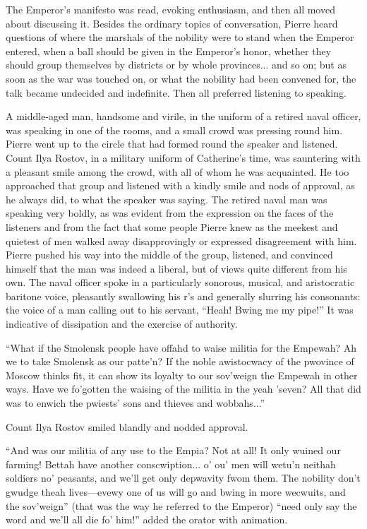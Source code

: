The Emperor's manifesto was read, evoking enthusiasm, and then
all moved about discussing it. Besides the ordinary topics of
conversation, Pierre heard questions of where the marshals of the
nobility were to stand when the Emperor entered, when a ball
should be given in the Emperor's honor, whether they should group
themselves by districts or by whole provinces... and so on; but
as soon as the war was touched on, or what the nobility had been
convened for, the talk became undecided and indefinite. Then all
preferred listening to speaking.

A middle-aged man, handsome and virile, in the uniform of a
retired naval officer, was speaking in one of the rooms, and a
small crowd was pressing round him. Pierre went up to the circle
that had formed round the speaker and listened. Count Ilya
Rostov, in a military uniform of Catherine's time, was sauntering
with a pleasant smile among the crowd, with all of whom he was
acquainted. He too approached that group and listened with a
kindly smile and nods of approval, as he always did, to what the
speaker was saying. The retired naval man was speaking very
boldly, as was evident from the expression on the faces of the
listeners and from the fact that some people Pierre knew as the
meekest and quietest of men walked away disapprovingly or
expressed disagreement with him. Pierre pushed his way into the
middle of the group, listened, and convinced himself that the man
was indeed a liberal, but of views quite different from his
own. The naval officer spoke in a particularly sonorous, musical,
and aristocratic baritone voice, pleasantly swallowing his r's
and generally slurring his consonants: the voice of a man calling
out to his servant, ``Heah! Bwing me my pipe!'' It was indicative
of dissipation and the exercise of authority.

``What if the Smolensk people have offahd to waise militia for
the Empewah? Ah we to take Smolensk as our patte'n? If the noble
awistocwacy of the pwovince of Moscow thinks fit, it can show its
loyalty to our sov'weign the Empewah in other ways. Have we
fo'gotten the waising of the militia in the yeah 'seven? All that
did was to enwich the pwiests' sons and thieves and wobbahs...''

Count Ilya Rostov smiled blandly and nodded approval.

``And was our militia of any use to the Empia? Not at all! It
only wuined our farming! Bettah have another conscwiption... o'
ou' men will wetu'n neithah soldiers no' peasants, and we'll get
only depwavity fwom them.  The nobility don't gwudge theah
lives---evewy one of us will go and bwing in more wecwuits, and
the sov'weign'' (that was the way he referred to the Emperor)
``need only say the word and we'll all die fo' him!'' added the
orator with animation.

